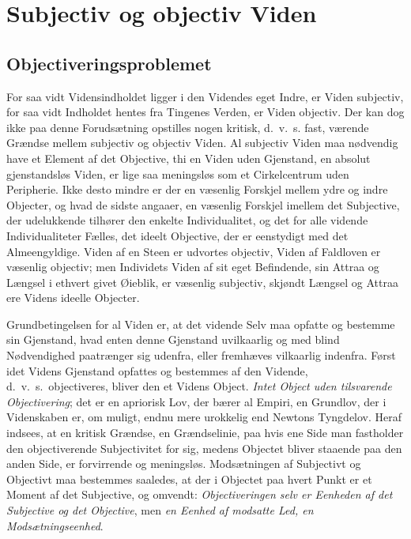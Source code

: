 \documentclass[12pt]{book}
\newcommand{\apage}[1]{\marginnote{\footnotesize\textit{[#1]}}}
\begin{document}
\chapter{Subjectiv og objectiv Viden}

\section{Objectiveringsproblemet}
\label{sec:5}

\noindent
For saa vidt Vidensindholdet ligger i den Videndes eget Indre, er
Viden subjectiv, for saa vidt Indholdet hentes fra Tingenes Verden,
er Viden objectiv. Der kan dog ikke paa denne Forudsætning opstilles
nogen kritisk, d.\ v.\ s. fast, værende Grændse mellem subjectiv og
objectiv Viden. Al subjectiv Viden maa nødvendig have et Element af
det Objective, thi en Viden uden Gjenstand, en absolut gjenstandsløs
Viden, er lige saa meningsløs som et Cirkelcentrum uden Peripherie.
Ikke desto mindre er der en væsenlig Forskjel mellem ydre og indre
Objecter, og hvad de sidste angaaer, en væsenlig Forskjel imellem det
Subjective, der udelukkende tilhører den enkelte Individualitet, og
det for alle vidende Individualiteter Fælles, det ideelt Objective,
der er eenstydigt med det Almeengyldige. Viden af en Steen er udvortes
objectiv, Viden af Faldloven er væsenlig objectiv; men Individets Viden
af sit eget Befindende, sin Attraa og Længsel i ethvert givet \apage{41} Øieblik,
er væsenlig subjectiv, skjøndt Længsel og Attraa ere Videns ideelle
Objecter.

Grundbetingelsen for al Viden er, at det vidende Selv maa opfatte og
bestemme sin Gjenstand, hvad enten denne Gjenstand uvilkaarlig og med
blind Nødvendighed paatrænger sig udenfra, eller fremhæves vilkaarlig
indenfra. Først idet Videns Gjenstand opfattes og bestemmes af den
Vidende, d.\ v.\ s.\ objectiveres, bliver den et Videns Object. \emph{Intet
Object uden tilsvarende Objectivering}; det er en apriorisk Lov, der
bærer al Empiri, en Grundlov, der i Videnskaben er, om muligt, endnu
mere urokkelig end Newtons Tyngdelov. Heraf indsees, at en kritisk
Grændse, en Grændselinie, paa hvis ene Side man fastholder den
objectiverende Subjectivitet for sig, medens Objectet bliver staaende
paa den anden Side, er forvirrende og meningsløs. Modsætningen af
Subjectivt og Objectivt maa bestemmes saaledes, at der i Objectet paa
hvert Punkt er et Moment af det Subjective, og omvendt: \emph{Objectiveringen
selv er Eenheden af det Subjective og det Objective}, men \emph{en Eenhed af
modsatte Led, en Modsætningseenhed}.
\end{document}
